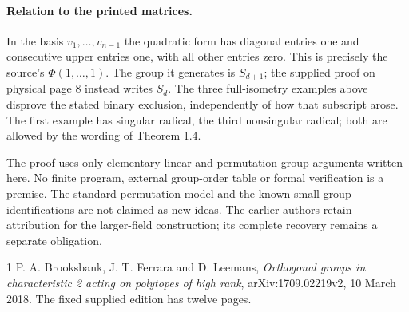 \documentclass[11pt,a4paper]{article}
\begin{document}
\paragraph{Relation to the printed matrices.}
In the basis $v_1,\ldots,v_{n-1}$ the quadratic form has
diagonal entries one and consecutive upper entries one,
with all other entries zero. This is precisely the source's
$\Phi(1,\ldots,1)$. The group it generates is $S_{d+1}$;
the supplied proof on physical page 8 instead writes $S_d$.
The three full-isometry examples above disprove the stated
binary exclusion, independently of how that subscript arose.
The first example has singular radical, the third nonsingular
radical; both are allowed by the wording of Theorem 1.4.

The proof uses only elementary linear and permutation group
arguments written here. No finite program, external group-order
table or formal verification is a premise. The standard
permutation model and the known small-group identifications
are not claimed as new ideas. The earlier authors retain
attribution for the larger-field construction; its complete
recovery remains a separate obligation.
\begin{thebibliography}{1}
 P. A. Brooksbank, J. T. Ferrara and D. Leemans,
\emph{Orthogonal groups in characteristic 2 acting on polytopes
of high rank}, arXiv:1709.02219v2, 10 March 2018.
The fixed supplied edition has twelve pages.
\end{thebibliography}
\end{document}
